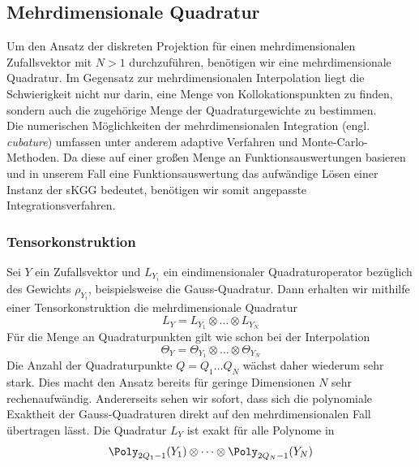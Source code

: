 \subsection{Mehrdimensionale Quadratur}
\label{chapter:multivariatequad}
Um den Ansatz der diskreten Projektion für einen mehrdimensionalen Zufallsvektor mit $N>1$ durchzuführen, benötigen wir eine mehrdimensionale Quadratur. Im Gegensatz zur mehrdimensionalen Interpolation liegt die Schwierigkeit nicht nur darin, eine Menge von Kollokationspunkten zu finden, sondern auch die zugehörige Menge der Quadraturgewichte zu bestimmen.\\
Die numerischen Möglichkeiten der mehrdimensionalen Integration (engl. \emph{cubature}) umfassen unter anderem adaptive Verfahren und Monte-Carlo-Methoden. Da diese auf einer großen Menge an Funktionsauswertungen basieren und in unserem Fall eine Funktionsauswertung das aufwändige Lösen einer Instanz der sKGG bedeutet, benötigen wir somit angepasste Integrationsverfahren.
\subsubsection*{Tensorkonstruktion}
Sei $Y$ ein Zufallsvektor und $L_{Y_i}$ ein eindimensionaler Quadraturoperator bezüglich des Gewichts $\rho_{Y_i}$, beispielsweise die Gauss-Quadratur. Dann erhalten wir mithilfe einer Tensorkonstruktion die mehrdimensionale Quadratur
\[L_Y=L_{Y_1}\otimes\dots\otimes L_{Y_N}\]
Für die Menge an Quadraturpunkten gilt wie schon bei der Interpolation
\[\Theta_Y=\Theta_{Y_1}\otimes\dots\otimes \Theta_{Y_N}\]
Die Anzahl der Quadraturpunkte $Q=Q_1\dots Q_N$ wächst daher wiederum sehr stark. Dies macht den Ansatz bereits für geringe Dimensionen $N$ sehr rechenaufwändig. Andererseits sehen wir sofort, dass sich die polynomiale Exaktheit der Gauss-Quadraturen direkt auf den mehrdimensionalen Fall übertragen lässt. Die Quadratur $L_Y$ ist exakt für alle Polynome in
\[\Poly_{2Q_1-1}(Y_1)\otimes\dots\otimes\Poly_{2Q_N-1}(Y_N)\]
